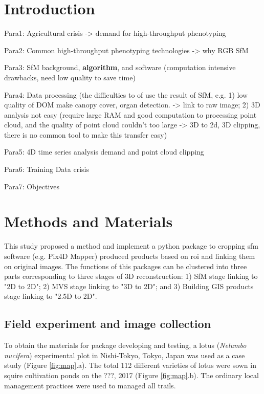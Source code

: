 \documentclass[sensors,article,submit,moreauthors, xelatex]{Definitions/mdpi}
\begin{document}
\section{Introduction}
Para1: Agricultural crisis -> demand for high-throughput phenotyping

Para2: Common high-throughput phenotyping technologies -> why RGB SfM

Para3: SfM background, \textbf{algorithm}, and software (computation intensive drawbacks, need low quality to save time)

Para4: Data processing (the difficulties to of use the result of SfM, e.g. 1) low quality of DOM make canopy cover, organ detection. -> link to raw image; 2) 3D analysis not easy (require large RAM and good computation to processing point cloud, and the quality of point cloud couldn't too large -> 3D to 2d, 3D clipping, there is no common tool to make this transfer easy)


Para5: 4D time series analysis demand and point cloud clipping

Para6: Training Data crisis

Para7: Objectives

\section{Methods and Materials}

This study proposed a method and implement a python package to cropping \acrshort*{sfm} software (e.g. Pix4D Mapper) produced products based on \acrfull*{roi} and linking them on original images. The functions of this packages can be clustered into three parts corresponding to three stages of 3D reconstruction: 1) SfM stage linking to "2D to 2D"; 2) MVS stage linking to "3D to 2D"; and 3) Building GIS products stage linking to "2.5D to 2D".

\subsection{Field experiment and image collection}

To obtain the materials for package developing and testing, a lotus (\textit{Nelumbo nucifera}) experimental plot in Nishi-Tokyo, Tokyo, Japan was used as a case study (Figure \ref{fig:map}.a). The total 112 different varieties of lotus were sown in squire cultivation ponds on the ???, 2017 (Figure \ref{fig:map}.b). The ordinary local management practices were used to managed all trails.
\end{document}
